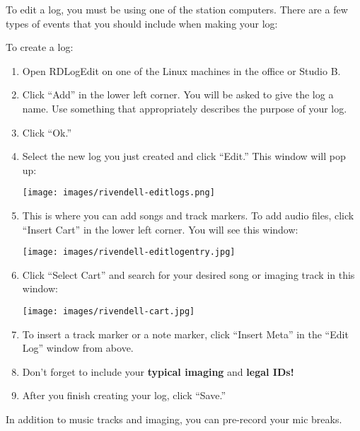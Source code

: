 \documentclass{witrman}
\begin{document}
To edit a log, you must be using one of the station computers.  There are a few
types of events that you should include when making your log:

\begin{itemize}
\end{itemize}

To create a log:
\begin{enumerate}
    \item Open RDLogEdit on one of the Linux machines in the office or Studio
        B.
    \item Click ``Add'' in the lower left corner.  You will be asked to give the
        log a name.  Use something that appropriately describes the purpose of
        your log.
    \item Click ``Ok.''
    \item Select the new log you just created and click ``Edit.'' This window
        will pop up:

        \texttt{[image: images/rivendell-editlogs.png]}
    \item This is where you can add songs and track markers.  To add audio
        files, click ``Insert Cart'' in the lower left corner.  You will see
        this window:

        \texttt{[image: images/rivendell-editlogentry.jpg]}
    \item Click ``Select Cart'' and search for your desired song or imaging
        track in this window:

        \texttt{[image: images/rivendell-cart.jpg]}
    \item To insert a track marker or a note marker, click ``Insert Meta'' in
        the ``Edit Log'' window from above.
    \item Don't forget to include your \textbf{typical imaging} and
        \textbf{legal IDs!}
    \item After you finish creating your log, click ``Save.''
\end{enumerate}

In addition to music tracks and imaging, you can pre-record your mic breaks.
\end{document}
